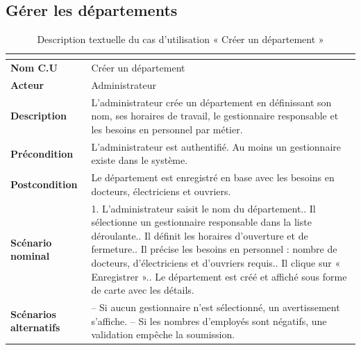 \documentclass[12pt,a4paper]{report}
\numberwithin{figure}{chapter}
\numberwithin{table}{chapter}
\begin{document}
\subsection{Gérer les départements}

\begin{table}[H]
  \centering
  \caption{Description textuelle du cas d'utilisation « Créer un département »}
  \label{tab:cu_departments}
  \renewcommand{\arraystretch}{1.4}
  \begin{tabularx}{\textwidth}{|>{\bfseries}l|L|}
    \hline
     \\
    \hline
    Nom C.U & Créer un département \\
    \hline
    Acteur & Administrateur \\
    \hline
    Description & L'administrateur crée un département en définissant son nom, ses horaires
      de travail, le gestionnaire responsable et les besoins en personnel par métier. \\
    \hline
    Précondition & L'administrateur est authentifié. Au moins un gestionnaire existe
      dans le système. \\
    \hline
    Postcondition & Le département est enregistré en base avec les besoins en docteurs,
      électriciens et ouvriers. \\
    \hline
    Scénario nominal &
      1. L'administrateur saisit le nom du département.. Il sélectionne un gestionnaire responsable dans la liste déroulante.. Il définit les horaires d'ouverture et de fermeture.. Il précise les besoins en personnel : nombre de docteurs, d'électriciens et d'ouvriers requis.. Il clique sur « Enregistrer ».. Le département est créé et affiché sous forme de carte avec les détails. \\
    \hline
    Scénarios alternatifs &
      -- Si aucun gestionnaire n'est sélectionné, un avertissement s'affiche.\newline
      -- Si les nombres d'employés sont négatifs, une validation empêche la soumission. \\
    \hline
  \end{tabularx}
\end{table}
\end{document}
